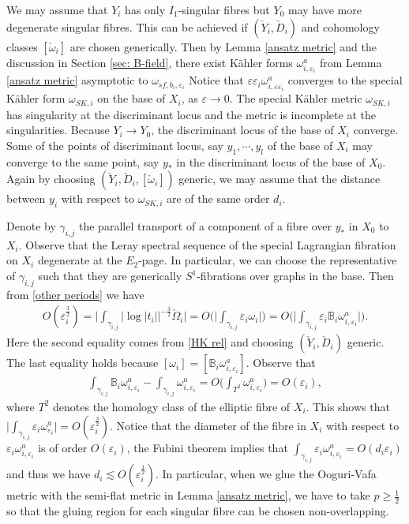 \documentclass[11pt]{amsart}
\theoremstyle{plain}
\theoremstyle{definition}
\numberwithin{equation}{section}
\renewcommand{\geq}{\geqslant}
\renewcommand{\epsilon}{\varepsilon}
\begin{document}
	We may assume that $Y_i$ has only $I_1$-singular fibres but $Y_0$ may have more degenerate singular fibres. This can be achieved if $(\check{Y}_i,\check{D}_i)$ and cohomology classes $[\check{\omega}_i]$ are chosen generically. 
	Then by Lemma \ref{ansatz metric} and the discussion in Section \ref{sec: B-field}, there exist K\"ahler forms $\omega_{i,\epsilon_i}^a$ from Lemma \ref{ansatz metric} asymptotic to $\omega_{sf,b_i,\epsilon_i}$ 
	Notice that $\epsilon\epsilon_i\omega_{i, \epsilon\epsilon_i}^a$ converges to the special K\"ahler form $\omega_{SK,i}$ on the base of $X_i$, as $\epsilon\rightarrow 0$. The special K\"ahler metric $\omega_{SK,i}$ has singularity at the discriminant locus and the metric is incomplete at the singularities. Because $Y_i\rightarrow Y_0$, the discriminant locus of the base of $X_i$ converge. 
	Some of the points of discriminant locus, say $y_1,\cdots, y_l$ of the base of $X_i$ may converge to the same point, say $y_*$ in the discriminant locus of the base of $X_0$. Again by choosing $(\check{Y}_i,\check{D}_i, [\check{\omega}_i])$ generic, we may assume that the distance between $y_i$ with respect to $\omega_{SK,i}$ are of the same order $d_i$. 
	
	Denote by $\gamma_{i,j}$ the parallel transport of a component of a fibre over $y_*$ in $X_0$ to $X_i$. Observe that the Leray spectral sequence of the special Lagrangian fibration on $X_i$ degenerate at the $E_2$-page. In particular, we can choose the representative of $\gamma_{i,j}$ such that they are generically $S^1$-fibrations over graphs in the base.   
	Then from \eqref{other periods} we have  
	\begin{align*}
		O(\epsilon_i^{\frac{3}{2}})=\bigg|\int_{\gamma_{i,j}}|\log{|t_i|}|^{-\frac{3}{2}}\check{\Omega}_i\bigg|=O\bigg(\big|\int_{\gamma_{i,j}}\epsilon_i \omega_{i}\big|\bigg)=O\bigg(\big|\int_{\gamma_{i,j}}\epsilon_i \mathbb{B}_i\omega^a_{i,\epsilon_i}\big|\bigg).
	\end{align*} Here the second equality comes from \eqref{HK rel} and choosing $(\check{Y}_i,\check{D}_i)$ generic. The last equality holds because $[\omega_i]=[\mathbb{B}_i\omega^a_{i,\epsilon_i}]$. Observe that 
	\begin{align*}
		\int_{\gamma_{i,j}}\mathbb{B}_i\omega^a_{i,\epsilon_i}-\int_{\gamma_{i,j}}\omega^a_{i,\epsilon_i}=O\bigg( \int_{T^2}\omega^a_{i,\epsilon_i}\bigg)=O(\epsilon_i),
	\end{align*} where $T^2$ denotes the homology class of the elliptic fibre of $X_i$.  This shows that 
$\big| \int_{\gamma_{i,j}}\varepsilon_i\omega^a_{\varepsilon_i}\big|=O(\varepsilon_i^{\frac{3}{2}})$. 
Notice that the diameter of the fibre in $X_i$ with respect to $\epsilon_i\omega^a_{i,\epsilon_i}$ is of order $O(\epsilon_i)$, the Fubini theorem implies that $\int_{\gamma_{i,j}}\epsilon_i\omega^a_{i,\epsilon_i}=O(d_i\epsilon_i)$ and thus we have $d_i \lesssim O(\epsilon_i^{\frac{1}{2}})$. In particular, when we glue the Ooguri-Vafa metric with the semi-flat metric in Lemma \ref{ansatz metric}, we have to take $p\geq \frac{1}{2}$ so that the gluing region for each singular fibre can be chosen non-overlapping. 
	
\end{document}
